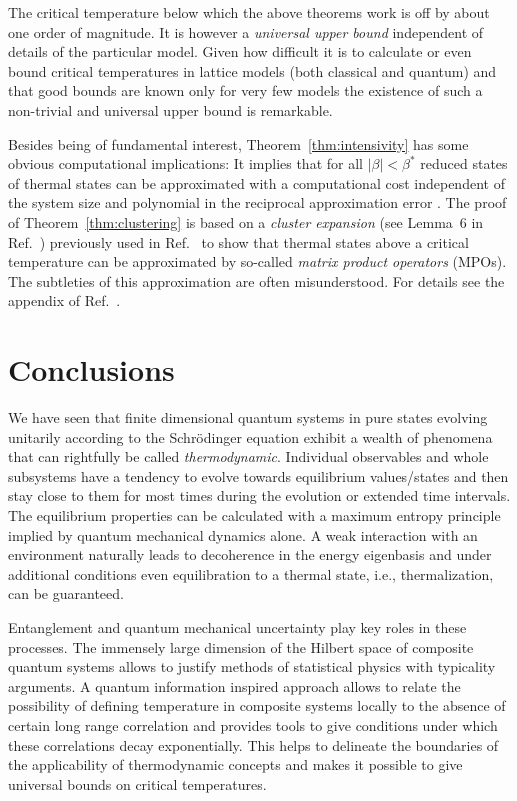 \documentclass[a4paper,12pt,listof=totoc,index=totoc,bibliography=totoc,headsepline=false,headings=normal,BCOR16.153846mm,DIV12,headinclude,twoside,cleardoublepage=empty,numbers=noenddot,final]{scrreprt}
\theoremstyle{mystyle}
\numberwithin{equation}{section}
\numberwithin{figure}{section}
\numberwithin{lemma}{section}
\numberwithin{theorem}{section}
\numberwithin{corollary}{section}
\numberwithin{definition}{section}
\numberwithin{conjecture}{section}
\numberwithin{observation}{section}
\newcommand{\+}{\mkern2mu}
\DeclareMathOperator{\1}{\mathds{1}}
\begin{document}
The critical temperature below which the above theorems work is off by about one order of magnitude.
It is however a \emph{universal upper bound} independent of details of the particular model.
Given how difficult it is to calculate or even bound critical temperatures in lattice models (both classical and quantum) and that good bounds are known only for very few models the existence of such a non-trivial and universal upper bound is remarkable.

Besides being of fundamental interest, Theorem~\ref{thm:intensivity} has some obvious computational implications:
It implies that for all $|\beta| < \beta^\ast$ reduced states of thermal states can be approximated with a computational cost independent of the system size and polynomial in the reciprocal approximation error \cite{Kliesch2013a}.
The proof of Theorem~\ref{thm:clustering} is based on a \emph{cluster expansion} (see Lemma~6 in Ref.~\cite{Kliesch2013a}) previously used in Ref.~\cite{Hastings06} to show that thermal states above a critical temperature can be approximated by so-called \emph{matrix product operators} (MPOs).
The subtleties of this approximation are often misunderstood.
For details see the appendix of Ref.~\cite{Kliesch2013a}.

\cleardoublepage

\chapter{Conclusions}
\label{sec:conclusions}
%
We have seen that finite dimensional quantum systems in pure states evolving unitarily according to the Schrödinger equation exhibit a wealth of phenomena that can rightfully be called \emph{thermodynamic}.
Individual observables and whole subsystems have a tendency to evolve towards equilibrium values/states and then stay close to them for most times during the evolution or extended time intervals.
The equilibrium properties can be calculated with a maximum entropy principle implied by quantum mechanical dynamics alone.
A weak interaction with an environment naturally leads to decoherence in the energy eigenbasis and under additional conditions even equilibration to a thermal state, i.e., thermalization, can be guaranteed.

Entanglement and quantum mechanical uncertainty play key roles in these processes.
The immensely large dimension of the Hilbert space of composite quantum systems allows to justify methods of statistical physics with typicality arguments.
A quantum information inspired approach allows to relate the possibility of defining temperature in composite systems locally to the absence of certain long range correlation and provides tools to give conditions under which these correlations decay exponentially.
This helps to delineate the boundaries of the applicability of thermodynamic concepts and makes it possible to give universal bounds on critical temperatures.
\end{document}
